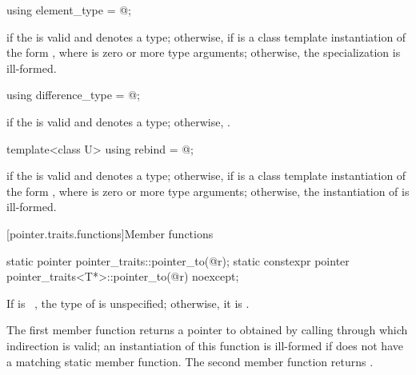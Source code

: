 %
\begin{itemdecl}
using element_type = @\seebelow@;
\end{itemdecl}

\begin{itemdescr}
\pnum
\ctype {} if
the   is valid and denotes a
type; otherwise,  if
 is a class template instantiation of the form ,
where  is zero or more type arguments; otherwise, the specialization is
ill-formed.
\end{itemdescr}

%
\begin{itemdecl}
using difference_type = @\seebelow@;
\end{itemdecl}

\begin{itemdescr}
\pnum
\ctype {} if
the   is valid and denotes a
type; otherwise,
.
\end{itemdescr}

%
\begin{itemdecl}
template<class U> using rebind = @\seebelow@;
\end{itemdecl}

\begin{itemdescr}
\pnum
\templalias {} if
the   is valid and denotes a
type; otherwise,
 if
 is a class template instantiation of the form ,
where  is zero or more type arguments; otherwise, the instantiation of
 is ill-formed.
\end{itemdescr}

[pointer.traits.functions]{Member functions}

%
\begin{itemdecl}
static pointer pointer_traits::pointer_to(@\seebelow@ r);
static constexpr pointer pointer_traits<T*>::pointer_to(@\seebelow@ r) noexcept;
\end{itemdecl}

\begin{itemdescr}
\pnum
\remarks
If  is \cv{}~, the type of
 is unspecified; otherwise, it is .

\pnum
\returns
The first member function returns a pointer to 
obtained by calling  through which
indirection is valid; an instantiation of this function is
ill-formed if  does not have a matching  static member
function. The second member function returns .
\end{itemdescr}

